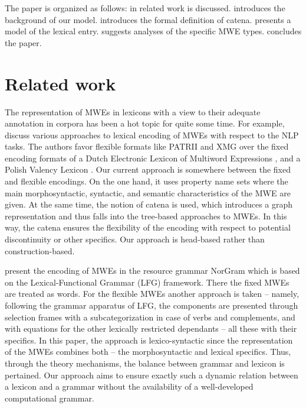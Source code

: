 \documentclass[output=paper,colorlinks,citecolor=brown]{langscibook}
\begin{document}
The paper is organized as follows: in  related work is discussed.  introduces the background of our model.  introduces the formal definition of catena.  presents a model of the lexical entry.  suggests analyses of the specific MWE types.  concludes the paper.

\section{Related work}\label{RelatedWorkOS}\largerpage

The representation of MWEs in lexicons with a view to their adequate annotation in corpora has been a hot topic for quite some time. For example, \citet{timm_lichte_2019_2579033} discuss various approaches to lexical encoding of MWEs with respect to the NLP tasks. The authors favor flexible formats like PATR\-II and XMG over the fixed encoding formats of a Dutch Electronic Lexicon of Multiword Expressions 
\citep{Grégoire2010}, and a Polish Valency Lexicon \citep{przepiorkowski-etal-2014-walenty}. Our current approach is somewhere between the fixed and flexible encodings. On the one hand, it uses property name sets where the main morphosyntactic, syntactic, and semantic characteristics of the MWE are given. At the same time, the notion of catena is used, which introduces a graph representation and thus falls into the tree-based approaches to MWEs. In this way, the catena ensures the flexibility of the encoding with respect to potential discontinuity or other specifics. Our approach is head-based rather than construction-based.

\citet{helge_dyvik_2019_2579037} present the encoding of MWEs in the resource grammar NorGram which is based on the Lexical-Functional Grammar (LFG) framework. There the fixed MWEs are treated as words. For the flexible MWEs another approach is taken -- namely, following the grammar apparatus of LFG, the components are presented through selection frames with a subcategorization in case of verbs and complements, and with equations for the other lexically restricted dependants -- all these with their specifics. In this paper, the approach is lexico-syntactic since the representation of the MWEs combines both -- the morphosyntactic and lexical specifics. Thus, through the theory mechanisms, the balance between grammar and lexicon is pertained. Our approach aims to ensure exactly such a dynamic relation between a lexicon and a grammar without the availability of a well-developed computational grammar.
\end{document}
